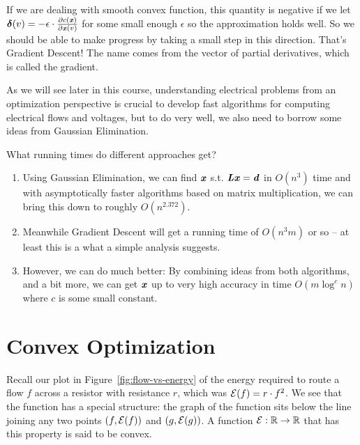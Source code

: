If we are dealing with smooth convex function,
this quantity is negative if we let $\boldsymbol{\delta}(v) = -\epsilon \cdot \frac{\partial
  c(\boldsymbol{\mathit{x}})}{\partial\boldsymbol{\mathit{x}}(v)}$ for some small enough $\epsilon$ so the
approximation holds well.
So we should be able to make progress by taking a small step in this
direction.
That's Gradient Descent!
The name comes from the vector of partial
derivatives, which is called the gradient.

As we will see later in this course, understanding electrical problems
from an optimization perspective is crucial to develop fast
algorithms for computing electrical flows and voltages, but to do very
well, we also need to borrow some ideas from Gaussian Elimination.

What running times do different approaches get?
\begin{enumerate}
\item Using Gaussian Elimination, we can find $\boldsymbol{\mathit{x}}$ s.t. $\boldsymbol{\mathit{L}} \boldsymbol{\mathit{x}} =
  \boldsymbol{\mathit{d}}$ in $O(n^3)$ time and with asymptotically faster algorithms based on matrix
  multiplication, we can bring this down to roughly $O(n^{2.372})$.
\item Meanwhile Gradient Descent will get a running time of $O(n^3m)$
  or so -- at least this is a what a simple analysis suggests.
\item However, we can do much better: By combining ideas from both
  algorithms, and a bit more,
  we can get $\boldsymbol{\mathit{x}}$ up to very high
  accuracy in time $O(m \log^c n)$ where $c$ is some small constant.
\end{enumerate}


\section{Convex Optimization}

Recall our plot in Figure~\ref{fig:flow-vs-energy} of the energy required to
route a flow $f$ across a resistor with resistance $r$, which was
$\mathcal{E}(f) = r\cdot f^2$.
%
We see that the function has a special structure: the graph of the function sits
below the line joining any two points $(f, \mathcal{E}(f))$ and $(g,\mathcal{E}(g))$.
A function $\mathcal{E} : \mathbb{R} \to \mathbb{R}$ that has this property is said to be convex.

